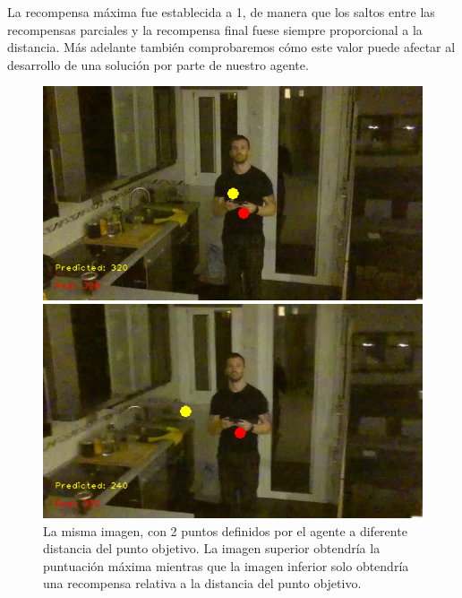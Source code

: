 La recompensa máxima fue establecida a 1, de manera que los saltos entre las recompensas parciales y la recompensa final fuese siempre proporcional a la distancia. Más adelante también comprobaremos cómo este valor puede afectar al desarrollo de una solución por parte de nuestro agente.
\medskip

\begin{figure}[H]
	\centering
	\parbox{5in}{
		\centering
		\includegraphics[scale=0.35]{figuras/recompensa/recompensa_maxima.png}
	}
	\qquad
	\begin{minipage}{5in}
		\centering
		\includegraphics[scale=0.35]{figuras/recompensa/recompensa_no_maxima.png}
	\end{minipage}
	\caption[Comparación de recompensa sobre la misma imagen dados dos puntos de vista distinto.]{La misma imagen, con 2 puntos definidos por el agente a diferente distancia del punto objetivo. La imagen superior obtendría la puntuación máxima mientras que la imagen inferior solo obtendría una recompensa relativa a la distancia del punto objetivo.}%
	\label{fig-recompensa-imagenes}
\end{figure}


